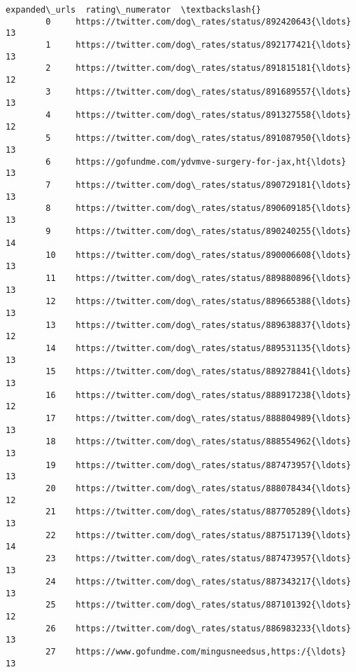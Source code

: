 \documentclass[11pt]{article}
\begin{document}
\begin{Verbatim}[commandchars=\\\{\}]
                                                  expanded\_urls  rating\_numerator  \textbackslash{}
        0     https://twitter.com/dog\_rates/status/892420643{\ldots}                13   
        1     https://twitter.com/dog\_rates/status/892177421{\ldots}                13   
        2     https://twitter.com/dog\_rates/status/891815181{\ldots}                12   
        3     https://twitter.com/dog\_rates/status/891689557{\ldots}                13   
        4     https://twitter.com/dog\_rates/status/891327558{\ldots}                12   
        5     https://twitter.com/dog\_rates/status/891087950{\ldots}                13   
        6     https://gofundme.com/ydvmve-surgery-for-jax,ht{\ldots}                13   
        7     https://twitter.com/dog\_rates/status/890729181{\ldots}                13   
        8     https://twitter.com/dog\_rates/status/890609185{\ldots}                13   
        9     https://twitter.com/dog\_rates/status/890240255{\ldots}                14   
        10    https://twitter.com/dog\_rates/status/890006608{\ldots}                13   
        11    https://twitter.com/dog\_rates/status/889880896{\ldots}                13   
        12    https://twitter.com/dog\_rates/status/889665388{\ldots}                13   
        13    https://twitter.com/dog\_rates/status/889638837{\ldots}                12   
        14    https://twitter.com/dog\_rates/status/889531135{\ldots}                13   
        15    https://twitter.com/dog\_rates/status/889278841{\ldots}                13   
        16    https://twitter.com/dog\_rates/status/888917238{\ldots}                12   
        17    https://twitter.com/dog\_rates/status/888804989{\ldots}                13   
        18    https://twitter.com/dog\_rates/status/888554962{\ldots}                13   
        19    https://twitter.com/dog\_rates/status/887473957{\ldots}                13   
        20    https://twitter.com/dog\_rates/status/888078434{\ldots}                12   
        21    https://twitter.com/dog\_rates/status/887705289{\ldots}                13   
        22    https://twitter.com/dog\_rates/status/887517139{\ldots}                14   
        23    https://twitter.com/dog\_rates/status/887473957{\ldots}                13   
        24    https://twitter.com/dog\_rates/status/887343217{\ldots}                13   
        25    https://twitter.com/dog\_rates/status/887101392{\ldots}                12   
        26    https://twitter.com/dog\_rates/status/886983233{\ldots}                13   
        27    https://www.gofundme.com/mingusneedsus,https:/{\ldots}                13   

\end{Verbatim}
\end{document}
